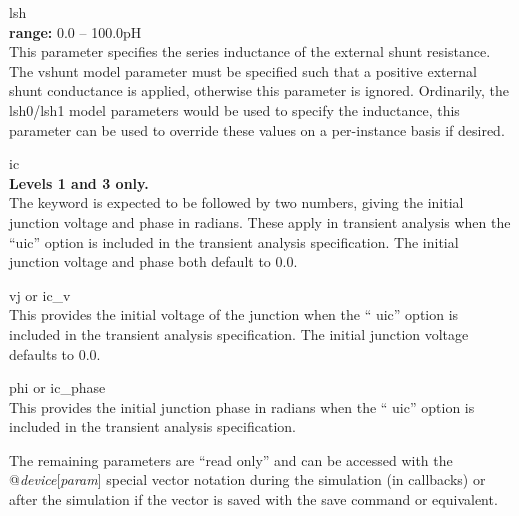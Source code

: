 \begin{description}
\item{\vt lsh}\\
{\bf range:} 0.0 -- 100.0pH\\
This parameter specifies the series inductance of the external shunt
resistance.  The {\vt vshunt} model parameter must be specified such
that a positive external shunt conductance is applied, otherwise this
parameter is ignored.  Ordinarily, the {\vt lsh0}/{\vt lsh1} model
parameters would be used to specify the inductance, this parameter can
be used to override these values on a per-instance basis if desired.

\item{\vt ic}\\
{\bf Levels 1 and 3 only.}\\
The keyword is expected to be followed by two numbers, giving the
initial junction voltage and phase in radians.  These apply in
transient analysis when the ``{\vt uic}'' option is included in the
transient analysis specification.  The initial junction voltage and
phase both default to 0.0.

\item{{\vt vj} or {\vt ic\_v}}\\
This provides the initial voltage of the junction when the ``{\vt
uic}'' option is included in the transient analysis specification. 
The initial junction voltage defaults to 0.0.

\item{{\vt phi} or {\vt ic\_phase}}\\
This provides the initial junction phase in radians when the ``{\vt
uic}'' option is included in the transient analysis specification.
\end{description}

The remaining parameters are ``read only'' and can be accessed with
the {\vt @}{\it device\/}[{\it param\/}] special vector notation
during the simulation (in callbacks) or after the simulation if the
vector is saved with the {\cb save} command or equivalent.

